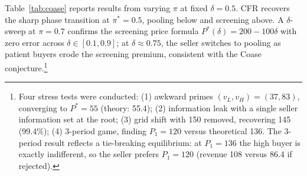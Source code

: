 Table~\ref{tab:coase} reports results from varying $\pi$ at fixed $\delta = 0.5$. CFR recovers the sharp phase transition at $\pi^* = 0.5$, pooling below and screening above. A $\delta$-sweep at $\pi = 0.7$ confirms the screening price formula $P^*(\delta) = 200 - 100\delta$ with zero error across $\delta \in [0.1, 0.9]$; at $\delta \approx 0.75$, the seller switches to pooling as patient buyers erode the screening premium, consistent with the Coase conjecture.\footnote{Four stress tests were conducted: (1) awkward primes $(v_L, v_H) = (37, 83)$, converging to $P^* = 55$ (theory: 55.4); (2) information leak with a single seller information set at the root; (3) grid shift with 150 removed, recovering 145 (99.4\%); (4) 3-period game, finding $P_1 = 120$ versus theoretical 136. The 3-period result reflects a tie-breaking equilibrium: at $P_1 = 136$ the high buyer is exactly indifferent, so the seller prefers $P_1 = 120$ (revenue 108 versus 86.4 if rejected).}

